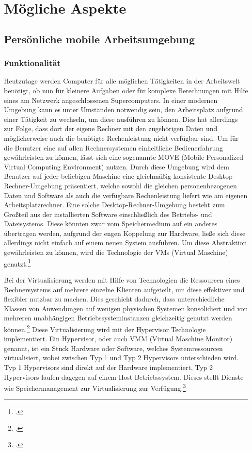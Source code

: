 \newpage
\section{Mögliche Aspekte}
\subsection{Persönliche mobile Arbeitsumgebung}
\subsubsection{Funktionalität}
Heutzutage werden Computer für alle möglichen Tätigkeiten in der Arbeitswelt benötigt, ob nun für kleinere Aufgaben oder für komplexe Berechnungen mit Hilfe eines am Netzwerk angeschlossenen Supercomputers. In einer modernen Umgebung kann es unter Umständen notwendig sein, den Arbeitsplatz aufgrund einer Tätigkeit zu wechseln, um diese ausführen zu können. Dies hat allerdings zur Folge, dass dort der eigene Rechner mit den zugehörigen Daten und möglicherweise auch die benötigte Rechenleistung nicht verfügbar sind.
Um für die Benutzer eine auf allen Rechnersystemen einheitliche Bedienerfahrung gewährleisten zu können, lässt sich eine sogenannte MOVE (Mobile Personalized Virtual Computing Environment) nutzen. Durch diese Umgebung wird dem Benutzer auf jeder beliebigen Maschine eine gleichmäßig konsistente Desktop-Rechner-Umgebung präsentiert, welche sowohl die gleichen personenbezogenen Daten und Software als auch die verfügbare Rechenleistung liefert wie am eigenen Arbeitsplatzrechner. Eine solche Desktop-Rechner-Umgebung besteht zum Großteil aus der installierten Software einschließlich des Betriebs- und Dateisystems. Diese könnten zwar vom Speichermedium auf ein anderes übertragen werden, aufgrund der engen Koppelung zur Hardware, ließe sich diese allerdings nicht einfach auf einem neuen System ausführen. Um diese Abstraktion gewährleisten zu können, wird die Technologie der VMs (Virtual Maschine) genutzt.\footcite[Vgl.][Seite 890 f.]{MOVE}

Bei der Virtualisierung werden mit Hilfe von Technologien die Ressourcen eines Rechnersystems auf mehrere einzelne Klienten aufgeteilt, um diese effektiver und flexibler nutzbar zu machen. Dies geschieht dadurch, dass unterschiedliche Klassen von Anwendungen auf wenigen physischen Systemen konsolidiert und von mehreren unabhängigen Betriebssysteminstanzen gleichzeitig genutzt werden können.\footcite[Vgl.][Seite 197]{InformatikSpektrum} Diese Virtualisierung wird mit der Hypervisor Technologie implementiert. Ein Hypervisor, oder auch VMM (Virtual Maschine Monitor) genannt, ist ein Stück Hardware oder Software, welches Systemressourcen virtualisiert, wobei zwischen Typ 1 und Typ 2 Hypervisors unterschieden wird. Typ 1 Hypervisors sind direkt auf der Hardware implementiert, Typ 2 Hypervisors laufen dagegen auf einem Host Betriebssystem. Dieses stellt Dienste wie Speichermanagement zur Virtualisierung zur Verfügung.\footcite[Vgl.][]{ibm}

